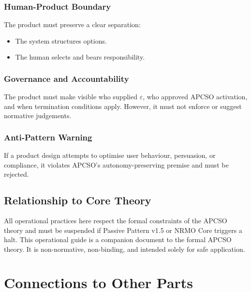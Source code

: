 \subsubsection{Human-Product Boundary}

The product must preserve a clear separation:

\begin{itemize}
\item The system structures options.
\item The human selects and bears responsibility.
\end{itemize}

\subsubsection{Governance and Accountability}

The product must make visible who supplied $\varepsilon$, who
approved APCSO activation, and when termination conditions apply.
However, it must not enforce or suggest normative judgements.

\subsubsection{Anti-Pattern Warning}

If a product design attempts to optimise user behaviour, persuasion,
or compliance, it violates APCSO's autonomy-preserving premise and
must be rejected.

\subsection{Relationship to Core Theory}

All operational practices here respect the formal constraints of the
APCSO theory and must be suspended if Passive Pattern v1.5 or NRMO
Core triggers a halt. This operational guide is a companion document
to the formal APCSO theory. It is non-normative, non-binding, and
intended solely for safe application.

\section*{Connections to Other Parts}

